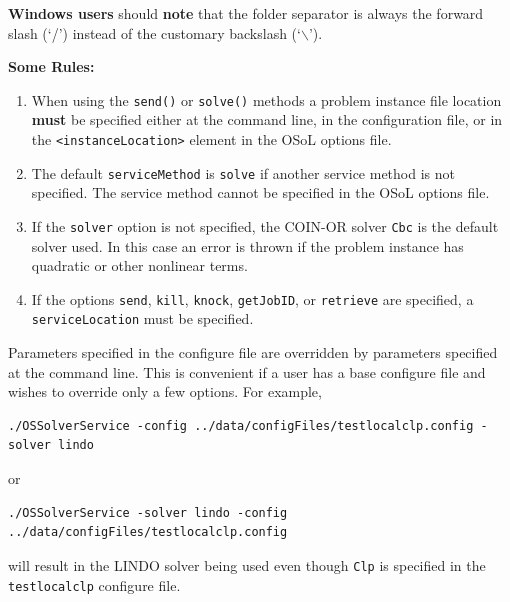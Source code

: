 \documentclass[11pt]{article}
\renewcommand{\_}{{\char"5F}}
\renewcommand{\{}{{\char"7B}}
\renewcommand{\}}{{\char"7D}}
\renewcommand{\^}{{\char"0D}}
\renewcommand{\'}{{\char"0D}}
\begin{document}
\begin{enumerate}[Step 1:]
{\bf Windows users} should {\bf note} that the folder separator is always 
the forward slash (`/') instead of the customary backslash (`$\backslash$').

\medskip

{\bf Some Rules:}

\begin{enumerate}
\item{}  When using the {\tt send()} or  {\tt solve()} methods
a problem instance file location {\bf must} be specified either at  the command line, in the configuration file,
or in the {\tt <instanceLocation>} element in the OSoL options file.

\item{}  The default {\tt serviceMethod} is {\tt solve} if another service method is not specified.
The service method cannot be specified in the OSoL options file.

\item{}  If the {\tt solver} option is not specified, the COIN-OR solver {\tt Cbc} is the default
solver used. In this case an error is thrown if the problem instance has quadratic or other nonlinear terms.

\item{}  If the options {\tt send}, {\tt kill},
{\tt knock},  {\tt getJobID},
or {\tt retrieve} are specified,
a  {\tt serviceLocation} must be specified.

\end{enumerate}



Parameters specified in the configure file are overridden by parameters specified at the command line.
This is convenient if a user has a base configure file and wishes to override only a few options. For example,
\begin{verbatim}
./OSSolverService -config ../data/configFiles/testlocalclp.config -solver lindo
\end{verbatim}
or
\begin{verbatim}
./OSSolverService -solver lindo -config ../data/configFiles/testlocalclp.config
\end{verbatim}
will result in the LINDO solver being used even though {\tt Clp} is specified in the
{\tt testlocalclp} configure file.




\end{enumerate}
\end{document}
